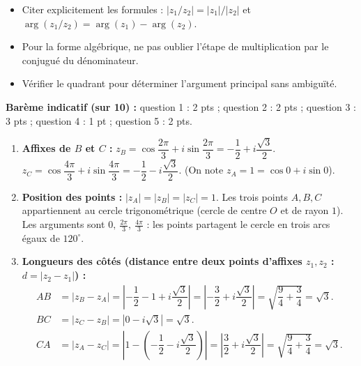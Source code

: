 \documentclass[11pt]{article}
\newcommand{\cle}[1]{{\popxbold\color{popdark}#1}}
\begin{document}
\begin{corrige}
\begin{attention}
\begin{itemize}
\item Citer explicitement les formules : $|z_1/z_2| = |z_1|/|z_2|$ et $\arg(z_1/z_2) = \arg(z_1) - \arg(z_2)$.
\item Pour la forme algébrique, ne pas oublier l'étape de multiplication par le conjugué du dénominateur.
\item Vérifier le quadrant pour déterminer l'argument principal sans ambiguïté.
\end{itemize}
\end{attention}
\end{corrige}

\begin{corrige}
\textbf{Barème indicatif (sur 10) :} question 1 : 2 pts ; question 2 : 2 pts ; question 3 : 3 pts ; question 4 : 1 pt ; question 5 : 2 pts.

\begin{enumerate}
\item \textbf{Affixes de $B$ et $C$ :}
$z_B = \cos\dfrac{2\pi}{3} + i\sin\dfrac{2\pi}{3} = -\dfrac{1}{2} + i\dfrac{\sqrt{3}}{2}$.
$z_C = \cos\dfrac{4\pi}{3} + i\sin\dfrac{4\pi}{3} = -\dfrac{1}{2} - i\dfrac{\sqrt{3}}{2}$.
(On note $z_A = 1 = \cos 0 + i\sin 0$).

\item \textbf{Position des points :}
$|z_A| = |z_B| = |z_C| = 1$. Les trois points $A, B, C$ appartiennent au \cle{cercle trigonométrique} (cercle de centre $O$ et de rayon $1$).
Les arguments sont $0,\ \frac{2\pi}{3},\ \frac{4\pi}{3}$ : les points partagent le cercle en trois arcs égaux de $120^\circ$.

\item \textbf{Longueurs des côtés (distance entre deux points d'affixes $z_1, z_2$ : $d = |z_2 - z_1|$) :}
\begin{align*}
AB &= |z_B - z_A| = \left|-\dfrac{1}{2} - 1 + i\dfrac{\sqrt{3}}{2}\right| = \left|-\dfrac{3}{2} + i\dfrac{\sqrt{3}}{2}\right| = \sqrt{\dfrac{9}{4} + \dfrac{3}{4}} = \sqrt{3}. \\
BC &= |z_C - z_B| = \left|0 - i\sqrt{3}\right| = \sqrt{3}. \\
CA &= |z_A - z_C| = \left|1 - \left(-\dfrac{1}{2} - i\dfrac{\sqrt{3}}{2}\right)\right| = \left|\dfrac{3}{2} + i\dfrac{\sqrt{3}}{2}\right| = \sqrt{\dfrac{9}{4} + \dfrac{3}{4}} = \sqrt{3}.
\end{align*}


\end{enumerate}
\end{corrige}
\end{document}
